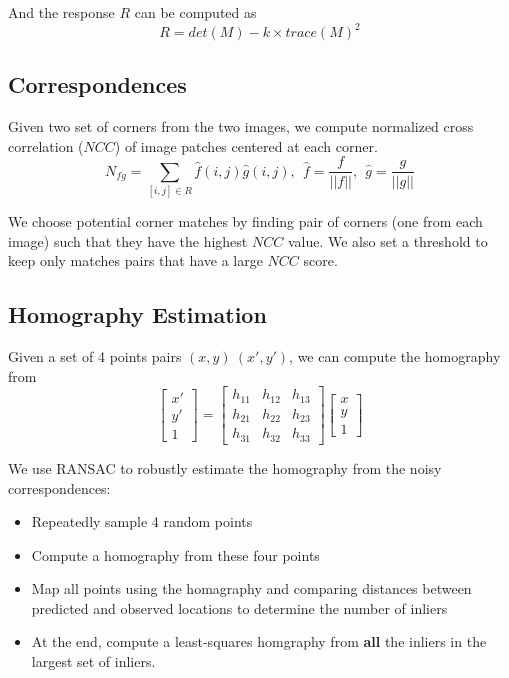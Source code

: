 \documentclass[letterpaper, 10 pt, conference]{ieeeconf}
\begin{document}
And the response $R$ can be computed as
\begin{equation}
R=det(M) - k\times trace(M)^2
\end{equation}

\subsection{Correspondences}
Given two set of corners from the two images, we compute normalized cross correlation ($NCC$) of image patches centered at each corner. 
\begin{equation}
N_{fg} = \sum_{[i, j]\in R}\hat{f}(i, j)\hat{g}(i, j),\ \ \hat{f} = \frac{f}{||f||}, \ \  \hat{g} = \frac{g}{||g||}
\end{equation}

We choose potential corner matches by finding pair of corners (one from each image) such that they have the highest $NCC$ value. We also set a threshold to keep only matches pairs that have a large $NCC$ score.
\subsection{Homography Estimation}
Given a set of 4 points pairs $(x,y)\ (x', y')$, we can compute the homography from
\begin{equation}
\left[ \begin{array}{c}
x'\\
y'\\
1
\end{array} \right] = \left[ \begin{array}{ccc}
h_{11} & h_{12} & h_{13} \\
h_{21} & h_{22} & h_{23} \\
h_{31} & h_{32} & h_{33} 
\end{array} \right]\left[ \begin{array}{c}
x\\
y\\
1
\end{array} \right] 
\end{equation}

We use RANSAC to robustly estimate the homography from the noisy correspondences:
\begin{itemize}
\item Repeatedly sample 4 random points
\item Compute a homography from these four points
\item Map all points using the homagraphy and comparing distances between predicted and observed locations to determine the number of inliers
\item At the end, compute a least-squares homgraphy from \textbf{all} the inliers in the largest set of inliers.
\end{itemize}
\end{document}
